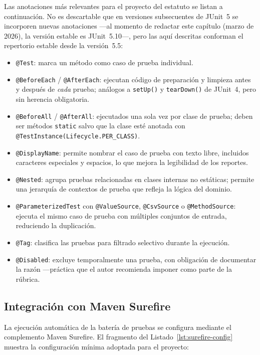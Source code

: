 Las anotaciones más relevantes para el proyecto del estatuto se listan a continuación.
No es descartable que en versiones subsecuentes de JUnit~5 se incorporen nuevas anotaciones
---al momento de redactar este capítulo (marzo de 2026), la versión estable es JUnit~5.10---,
pero las aquí descritas conforman el repertorio estable desde la versión~5.5:

\begin{itemize}
  \item \texttt{@Test}: marca un método como caso de prueba individual.
  \item \texttt{@BeforeEach} / \texttt{@AfterEach}: ejecutan código de preparación y limpieza
        antes y después de \emph{cada} prueba; análogos a \texttt{setUp()} y \texttt{tearDown()}
        de JUnit~4, pero sin herencia obligatoria.
  \item \texttt{@BeforeAll} / \texttt{@AfterAll}: ejecutados una sola vez por clase de prueba;
        deben ser métodos \texttt{static} salvo que la clase esté anotada con
        \texttt{@TestInstance(Lifecycle.PER\_CLASS)}.
  \item \texttt{@DisplayName}: permite nombrar el caso de prueba con texto libre, incluidos
        caracteres especiales y espacios, lo que mejora la legibilidad de los reportes.
  \item \texttt{@Nested}: agrupa pruebas relacionadas en clases internas no estáticas; permite
        una jerarquía de contextos de prueba que refleja la lógica del dominio.
  \item \texttt{@ParameterizedTest} con \texttt{@ValueSource}, \texttt{@CsvSource} o
        \texttt{@MethodSource}: ejecuta el mismo caso de prueba con múltiples conjuntos de
        entrada, reduciendo la duplicación.
  \item \texttt{@Tag}: clasifica las pruebas para filtrado selectivo durante la ejecución.
  \item \texttt{@Disabled}: excluye temporalmente una prueba, con obligación de documentar
        la razón ---práctica que el autor recomienda imponer como parte de la rúbrica.
\end{itemize}

\subsection{Integración con Maven Surefire}
\label{subsec:maven-surefire}

La ejecución automática de la batería de pruebas se configura mediante el complemento
Maven Surefire. El fragmento del Listado~\ref{lst:surefire-config} muestra la configuración
mínima adoptada para el proyecto:

